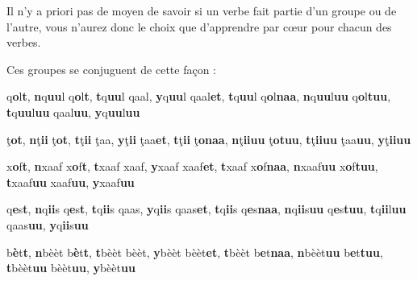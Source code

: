 Il n'y a priori pas de moyen de savoir si un verbe fait partie d'un groupe ou de l'autre, vous n'aurez donc le choix que d'apprendre par c\oe ur pour chacun des verbes. 

Ces groupes se conjuguent de cette façon : 

    {q\textbf{o}l\textbf{t}, \textbf{n}q\textbf{uu}l}
    {q\textbf{o}l\textbf{t}, \textbf{t}q\textbf{uu}l}
    {qaal, \textbf{y}q\textbf{uu}l}
    {qaal\textbf{et}, \textbf{t}q\textbf{uu}l}
    {q\textbf{o}l\textbf{naa}, \textbf{n}q\textbf{uu}l\textbf{uu}}
    {q\textbf{o}l\textbf{tuu}, \textbf{t}q\textbf{uu}l\textbf{uu}}
    {qaal\textbf{uu}, \textbf{y}q\textbf{uu}l\textbf{uu}}

    {\c{t}\textbf{o}\textcrh\textbf{t}, \textbf{n}\c{t}\textbf{ii}\textcrh}
    {\c{t}\textbf{o}\textcrh\textbf{t}, \textbf{t}\c{t}\textbf{ii}\textcrh}
    {\c{t}aa\textcrh, \textbf{y}\c{t}\textbf{ii}\textcrh}
    {\c{t}aa\textcrh\textbf{et}, \textbf{t}\c{t}\textbf{ii}\textcrh}
    {\c{t}\textbf{o}\textcrh\textbf{naa}, \textbf{n}\c{t}\textbf{ii}\textcrh\textbf{uu}}
    {\c{t}\textbf{o}\textcrh\textbf{tuu}, \textbf{t}\c{t}\textbf{ii}\textcrh\textbf{uu}}
    {\c{t}aa\textcrh\textbf{uu}, \textbf{y}\c{t}\textbf{ii}\textcrh\textbf{uu}}

    {x\textbf{o}f\textbf{t}, \textbf{n}xaaf}
    {x\textbf{o}f\textbf{t}, \textbf{t}xaaf}
    {xaaf, \textbf{y}xaaf}
    {xaaf\textbf{et}, \textbf{t}xaaf}
    {x\textbf{o}f\textbf{naa}, \textbf{n}xaaf\textbf{uu}}
    {x\textbf{o}f\textbf{tuu}, \textbf{t}xaaf\textbf{uu}}
    {xaaf\textbf{uu}, \textbf{y}xaaf\textbf{uu}}

    {q\textbf{e}s\textbf{t}, \textbf{n}q\textbf{ii}s}
    {q\textbf{e}s\textbf{t}, \textbf{t}q\textbf{ii}s}
    {qaas, \textbf{y}q\textbf{ii}s}
    {qaas\textbf{et}, \textbf{t}q\textbf{ii}s}
    {q\textbf{e}s\textbf{naa}, \textbf{n}q\textbf{ii}s\textbf{uu}}
    {q\textbf{e}s\textbf{tuu}, \textbf{t}q\textbf{ii}l\textbf{uu}}
    {qaas\textbf{uu}, \textbf{y}q\textbf{ii}s\textbf{uu}}

    {b\textbf{è}t\textbf{t}, \textbf{n}bèèt}
    {b\textbf{è}t\textbf{t}, \textbf{t}bèèt}
    {bèèt, \textbf{y}bèèt}
    {bèèt\textbf{et}, \textbf{t}bèèt}
    {b\textbf{e}t\textbf{naa}, \textbf{n}bèèt\textbf{uu}}
    {b\textbf{e}t\textbf{tuu}, \textbf{t}bèèt\textbf{uu}}
    {bèèt\textbf{uu}, \textbf{y}bèèt\textbf{uu}}

